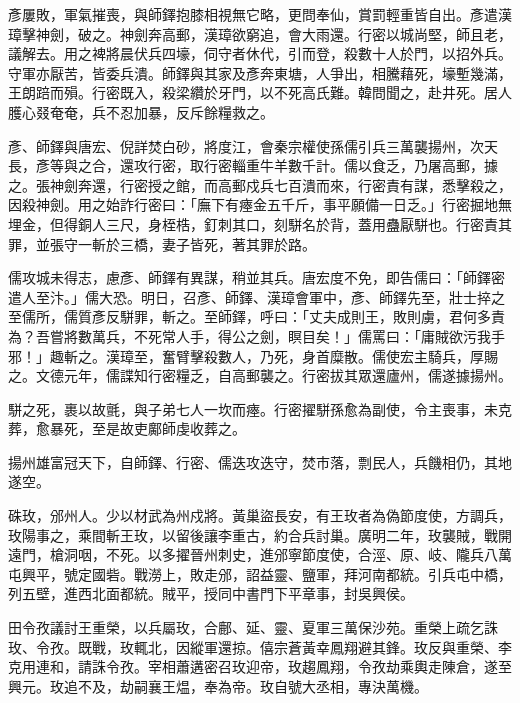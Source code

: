 \begin{pinyinscope}
 彥屢敗，軍氣摧喪，與師鐸抱膝相視無它略，更問奉仙，賞罰輕重皆自出。彥遣漢璋擊神劍，破之。神劍奔高郵，漢璋欲窮追，會大雨還。行密以城尚堅，師且老，議解去。用之裨將晨伏兵四壕，伺守者休代，引而登，殺數十人於門，以招外兵。守軍亦厭苦，皆委兵潰。師鐸與其家及彥奔東塘，人爭出，相騰藉死，壕塹幾滿，王朗踣而殞。行密既入，殺梁纘於牙門，以不死高氏難。韓問聞之，赴井死。居人臒心叕奄奄，兵不忍加暴，反斥餘糧救之。



 彥、師鐸與唐宏、倪詳焚白砂，將度江，會秦宗權使孫儒引兵三萬襲揚州，次天長，彥等與之合，還攻行密，取行密輜重牛羊數千計。儒以食乏，乃屠高郵，據之。張神劍奔還，行密授之館，而高郵戍兵七百潰而來，行密責有謀，悉擊殺之，因殺神劍。用之始詐行密曰：「廡下有瘞金五千斤，事平願備一日乏。」行密掘地無埋金，但得銅人三尺，身桎梏，釘刺其口，刻駢名於背，蓋用蠱厭駢也。行密責其罪，並張守一斬於三橋，妻子皆死，著其罪於路。



 儒攻城未得志，慮彥、師鐸有異謀，稍並其兵。唐宏度不免，即告儒曰：「師鐸密遣人至汴。」儒大恐。明日，召彥、師鐸、漢璋會軍中，彥、師鐸先至，壯士捽之至儒所，儒質彥反駢罪，斬之。至師鐸，呼曰：「丈夫成則王，敗則虜，君何多責為？吾嘗將數萬兵，不死常人手，得公之劍，瞑目矣！」儒罵曰：「庸賊欲污我手邪！」趣斬之。漢璋至，奮臂擊殺數人，乃死，身首糜散。儒使宏主騎兵，厚賜之。文德元年，儒諜知行密糧乏，自高郵襲之。行密拔其眾還廬州，儒遂據揚州。



 駢之死，裹以故氈，與子弟七人一坎而瘞。行密擢駢孫愈為副使，令主喪事，未克葬，愈暴死，至是故吏鄺師虔收葬之。



 揚州雄富冠天下，自師鐸、行密、儒迭攻迭守，焚市落，剽民人，兵饑相仍，其地遂空。



 硃玫，邠州人。少以材武為州戍將。黃巢盜長安，有王玫者為偽節度使，方調兵，玫陽事之，乘間斬王玫，以留後讓李重古，約合兵討巢。廣明二年，玫襲賊，戰開遠門，槍洞咽，不死。以多擢晉州刺史，進邠寧節度使，合涇、原、岐、隴兵八萬屯興平，號定國砦。戰澇上，敗走邠，詔益靈、鹽軍，拜河南都統。引兵屯中橋，列五壁，進西北面都統。賊平，授同中書門下平章事，封吳興侯。



 田令孜議討王重榮，以兵屬玫，合鄜、延、靈、夏軍三萬保沙苑。重榮上疏乞誅玫、令孜。既戰，玫輒北，因縱軍還掠。僖宗蒼黃幸鳳翔避其鋒。玫反與重榮、李克用連和，請誅令孜。宰相蕭遘密召玫迎帝，玫趨鳳翔，令孜劫乘輿走陳倉，遂至興元。玫追不及，劫嗣襄王煴，奉為帝。玫自號大丞相，專決萬機。




\end{pinyinscope}
